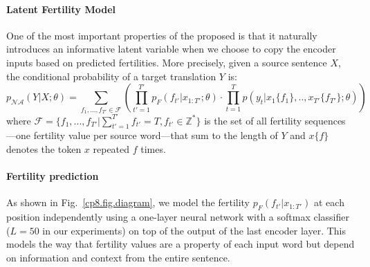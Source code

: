 \paragraph{Latent Fertility Model}
One of the most important properties of the proposed \model{} is that it naturally introduces an informative latent variable when we choose to copy the encoder inputs based on predicted fertilities.  More precisely, given a source sentence $X$, the conditional probability of a target translation $Y$ is:
\begin{equation}
p_{\mathcal{NA}}(Y|X; \theta) = \sum_{f_1,...,f_{T'} \in \mathcal{F}}\left(\prod_{t'=1}^{T'}p_F(f_{t'}|x_{1:T'};\theta)\cdot \prod_{t=1}^{T} p(y_t| x_1\{f_1\}, .., x_{T'}\{f_{T'}\};\theta)\right)
\label{cp8.eq.latent_fer}
\end{equation}
where $\mathcal{F}=\{f_1,...,f_{T'}| \sum_{t'=1}^{T'}f_{t'}= T, f_{t'} \in \mathbb{Z^*} \}$ is the set of all fertility sequences---one fertility value per source word---that sum to the length of $Y$ and $x\{f\}$ denotes the token $x$ repeated $f$ times.

\paragraph{Fertility prediction} As shown in Fig.~\ref{cp8.fig.diagram}, we model the fertility $p_F(f_{t'}|x_{1:T'})$ at each position independently using a one-layer neural network with a softmax classifier ($L=50$ in our experiments) on top of the output of the last encoder layer. This models the way that fertility values are a property of each input word but depend on information and context from the entire sentence.


